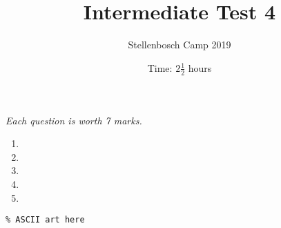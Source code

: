 \documentclass{article}
\title{Intermediate Test 4}
\author{Stellenbosch Camp 2019}
\date{Time: $2\frac{1}{2}$ hours}
\begin{document}
\maketitle
\thispagestyle{empty}

\hfill\textit{Each question is worth 7 marks.}

\vfill
\vfill


\begin{enumerate}[1.]

\item %


\vfill

\item %



\vfill

\item %


\vfill

\item %


\vfill

\item %


\end{enumerate}


\vfill
\vfill
\begin{center}
\begin{BVerbatim}
\end{BVerbatim}
\end{center}
\end{document}
